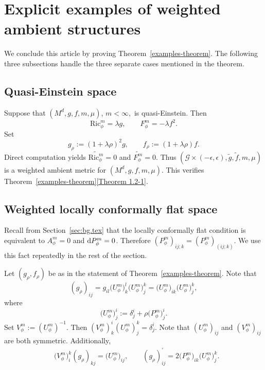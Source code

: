 \documentclass[pdftex]{sigma}
\numberwithin{equation}{section}
\begin{document}
\section{Explicit examples of weighted ambient structures}
\label{sec:explicit-examples}

We conclude this article by proving Theorem~\ref{examples-theorem}. The following three subsections handle the three separate cases mentioned in the theorem.



\subsection{Quasi-Einstein space}

Suppose that $(M^d,g,f,m,\mu)$, $m<\infty,$ is quasi-Einstein. Then
\begin{equation*}
\mathrm{Ric}_{\phi}^m=\lambda g,
\qquad F_\phi^m=-\lambda f^2.
\end{equation*}
Set
\begin{equation*}
g_\rho:=(1+\lambda \rho)^2 g,\qquad
f_\rho:=(1+\lambda\rho)f.
\end{equation*}
Direct computation yields $\widetilde{\mathrm{Ric}_\phi^m}=0$ and $\widetilde{F_\phi^m}=0$. Thus $(\mathcal{G}\times (-\epsilon,\epsilon),\widetilde{g},\widetilde{f},m,\mu)$ is a weighted ambient metric for $(M^d,g,f,m,\mu)$. This verifies Theorem~\ref{examples-theorem}\ref{Theorem 1.2-1}.


\subsection{Weighted locally conformally flat space}

Recall from Section~\ref{sec:bg.tex} that the locally conformally flat condition is equivalent to $A_\phi^m=0$ and ${\rm d}P_\phi^m=0$.
Therefore $(P_\phi^m)_{ij;k}=(P_\phi^m)_{(ij;k)}$. We use this fact repeatedly in the rest of the section.


Let $(g_\rho,f_\rho)$ be as in the statement of Theorem~\ref{examples-theorem}. Note that
\[
(g_\rho)_{i j}=g_{i l} \big(U_\phi^m\big)_{k}^{l} \big(U_\phi^m\big)_{j}^{k}=\big(U_\phi^m\big)_{i k} \big(U_\phi^m\big)_{j}^{k},
\]
where
\[
\big(U_\phi^m\big)_{j}^{i}:=\delta_{j}^{i}+ \rho\big(P_\phi^m\big)_{j}^{i}.
\]
Set $V_\phi^m:=(U_\phi^m)^{-1}$. Then $(V_\phi^m)_{k}^{i} (U_\phi^m)_{j}^{k}=\delta_{j}^{i}$. Note that $(U_\phi^m)_{i j}$ and $(V_\phi^m)_{i j}$ are both symmetric. Additionally,
\begin{align}
&\big(V_\phi^m\big)_{i}^{k} (g_\rho)_{k j}=\big(U_\phi^m\big)_{i j},\qquad
(g_\rho)_{i j}^{\prime}=2 \big(P_\phi^m\big)_{i k} \big(U_\phi^m\big)_{j}^{k}.\label{g'}
\end{align}
\end{document}

